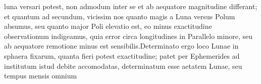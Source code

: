 luna\protect{} versari potest, non admodum inter se et ab aequatore\protect{} magnitudine differant; et quantum ad secundum, vicissim nos quanto magis a Luna\protect{} versus Polum\protect{} absumus, seu quanto major Poli elevatio\protect{} est, eo minus exactitudine  observationum indigeamus, quia error circa  longitudines in Parallelo\protect{} minore, seu ab aequatore \protect{} remotione minus est sensibilis.\pend \pstart Determinato ergo loco Lunae\protect{} in sphaera fixarum\protect{}, quanta fieri potest exactitudine; patet per Ephemerides\protect{} ad institutum istud debite accomodatas, determinatum esse aetatem Lunae\protect{}, seu tempus mensis omnium 